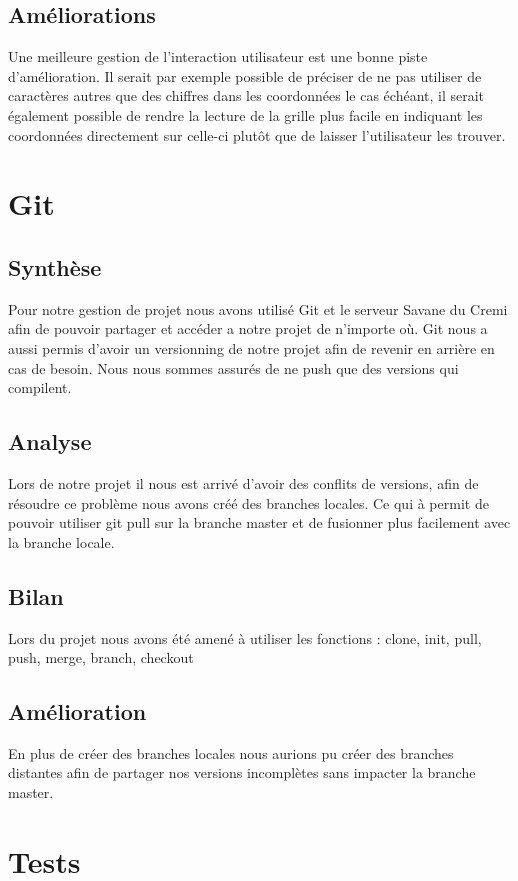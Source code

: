 \documentclass[12pt]{article}
\begin{document}
\subsection{Améliorations}

Une meilleure gestion de l'interaction utilisateur est une bonne piste d'amélioration.
Il serait par exemple possible de préciser de ne pas utiliser de caractères autres que
des chiffres dans les coordonnées le cas échéant, il serait également possible de rendre
la lecture de la grille plus facile en indiquant les coordonnées directement sur celle-ci 
plutôt que de laisser l'utilisateur les trouver.



\section{Git}
\subsection{Synthèse}
Pour notre gestion de projet nous avons utilisé Git et le serveur Savane du Cremi afin de pouvoir partager et accéder a notre projet de n'importe où.
Git nous a aussi permis d'avoir un versionning de notre projet afin de revenir en arrière en cas de besoin.
Nous nous sommes assurés de ne push que des versions qui compilent.
\subsection{Analyse}
Lors de notre projet il nous est arrivé d'avoir des conflits de versions, afin de résoudre ce problème nous avons créé des branches locales. 
Ce qui à permit de pouvoir utiliser git pull sur la branche master et de fusionner plus facilement avec la branche locale.
\subsection{Bilan}
Lors du projet nous avons été amené à utiliser les fonctions : clone, init, pull, push, merge, branch, checkout
\subsection{Amélioration}
En plus de créer des branches locales nous aurions pu créer des branches distantes afin de partager nos versions incomplètes sans impacter la branche master.



\section{Tests}
\end{document}
